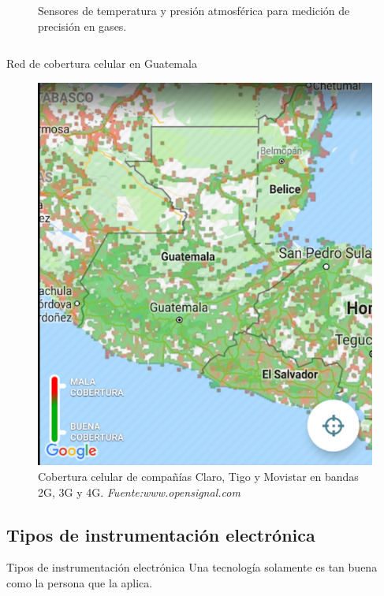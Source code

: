 \documentclass[]{beamer}
\begin{document}
\begin{frame}{}
\begin{columns}
\begin{column}{0.3\textwidth}
\begin{figure}
        \caption{Sensores de temperatura y presión atmosférica para medición de precisión en gases.}
        \label{}
      \end{figure}
    \end{column}
  \end{columns}
\end{frame}

\begin{frame}{Red de cobertura celular en Guatemala}
  \begin{figure}
    \includegraphics[height=0.75\textheight]{Docs/opensky}
    \caption{Cobertura celular de compañías Claro, Tigo y Movistar en bandas 2G, 3G y 4G.
    \emph{Fuente:www.opensignal.com}}
    \label{}
  \end{figure}
\end{frame}

\subsection{Tipos de instrumentación electrónica}
\begin{frame}{Tipos de instrumentación electrónica}
  \center
  Una tecnología solamente es tan buena como la persona que la aplica.
\end{frame}
\end{document}
